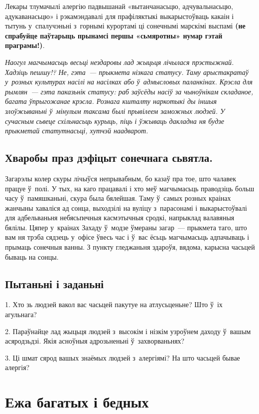 Лекары тлумачылі алергію падвышанай «вытанчанасьцю, адчувальнасьцю, адукаванасьцю» і рэкамэндавалі для прафіляктыкі выкарыстоўваць какаін і тытунь у~спалучэньні з~горнымі курортамі ці сонечнымі марскімі выспамі \textbf{(не спрабуйце паўтарыць прынамсі першы «сьмяротны» нумар гэтай праграмы!)}.

\emph{Наогул магчымасьць весьці нездаровы лад жыцьця лічылася прэстыжнай. Хадзіць пешшу!? Не, гэта~--- прыкмета нізкага статусу. Таму арыстакратаў у~розных культурах насілі на насілках або ў~адмысловых паланкінах. Крэсла для рымлян~--- гэта паказьнік статусу: раб заўсёды насіў за чыноўнікам складаное, багата ўпрыгожанае крэсла. Рознага кшталту наркотыкі ды іншыя злоўжываньні ў~мінулым таксама былі прывілеем заможных людзей. У сучасным сьвеце схільнасьць курыць, піць і ўжываць дакладна ня будзе прыкметай статутнасьці, хутчэй наадварот.}

\subsection*{Хваробы праз дэфіцыт сонечнага сьвятла.}

Загарэлы колер скуры лічыўся непрывабным, бо казаў пра тое, што чалавек працуе ў~полі. У тых, на каго працавалі і хто меў магчымасьць праводзіць больш часу ў~памяшканьні, скура была бялейшая. Таму ў~самых розных краінах жанчыны хаваліся ад сонца, выходзілі на вуліцу з~парасонамі і выкарыстоўвалі для адбельваньня небясьпечныя касмэтычныя сродкі, напрыклад валавяныя бялілы. Цяпер у~краінах Захаду ў~модзе ўмераны загар~--- прыкмета таго, што вам ня трэба сядзець у~офісе ўвесь час і ў~вас ёсьць магчымасьць адпачываць і прымаць сонечныя ванны. З пункту гледжаньня здароўя, вядома, карысна часьцей бываць на сонцы.

\subsection*{Пытаньні і заданьні}

1. Хто зь людзей вакол вас часьцей пакутуе на атлусьценьне? Што ў~іх агульнага?

2. Параўнайце лад жыцьця людзей з~высокім і нізкім узроўнем даходу ў~вашым асяродзьдзі. Якія асноўныя адрозьненьні ў~захворваньнях?

3. Ці шмат сярод вашых знаёмых людзей з~алергіямі? На што часьцей бывае алергія?


\section{Ежа багатых і бедных}


